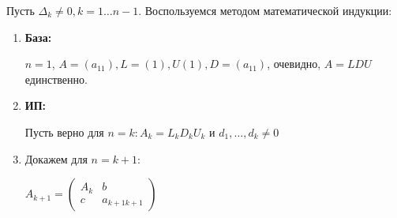     Пусть $\Delta_k \neq 0, k = 1\ldots n-1$. Воспользуемся методом математической индукции:
    \begin{enumerate}
        \item[] \textbf{База:}

        $n=1$, $A = (a_{11}), L= (1), U(1) , D = (a_{11})$, очевидно, $A = LDU$ единственно.
        \item[] \textbf{ИП:}

        Пусть верно для $n =k: A_k  =L_k D_k U_k$ и $d_1,\ldots, d_k \neq 0$

        \item[] Докажем для $n = k+1$:

        $A_{k+1} = \begin{pmatrix}
            A_k & b \\
            c & a_{k+1 k+1}
        \end{pmatrix}$


\end{enumerate}
